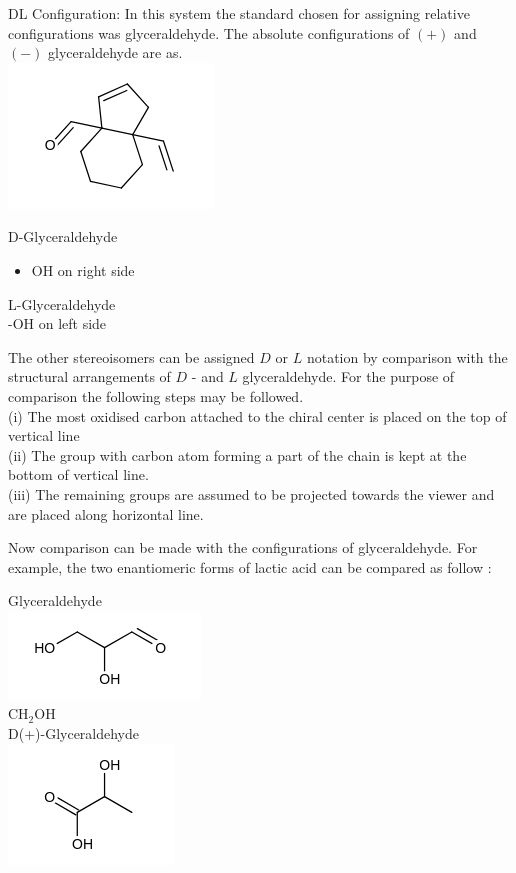 \documentclass[10pt]{article}
\begin{document}
DL Configuration: In this system the standard chosen for assigning relative configurations was glyceraldehyde. The absolute configurations of $(+)$ and $(-)$ glyceraldehyde are as.\\
\includegraphics{smile-29c6adf804fff7292d07376a6d357fbc2f118c42}

D-Glyceraldehyde

\begin{itemize}
  \item OH on right side\\

\end{itemize}

L-Glyceraldehyde\\
-OH on left side

The other stereoisomers can be assigned $D$ or $L$ notation by comparison with the structural arrangements of $D$ - and $L$ glyceraldehyde. For the purpose of comparison the following steps may be followed.\\
(i) The most oxidised carbon attached to the chiral center is placed on the top of vertical line\\
(ii) The group with carbon atom forming a part of the chain is kept at the bottom of vertical line.\\
(iii) The remaining groups are assumed to be projected towards the viewer and are placed along horizontal line.

Now comparison can be made with the configurations of glyceraldehyde. For example, the two enantiomeric forms of lactic acid can be compared as follow :

Glyceraldehyde\\
\includegraphics{smile-d65e8924df072b85ee3eee4dea602698ac898769}\\
$\mathrm{CH}_{2} \mathrm{OH}$\\
D(+)-Glyceraldehyde\\
\includegraphics{smile-5f8ebed70c8bfc39c1d220aea480113a543a33ca}
\end{document}
